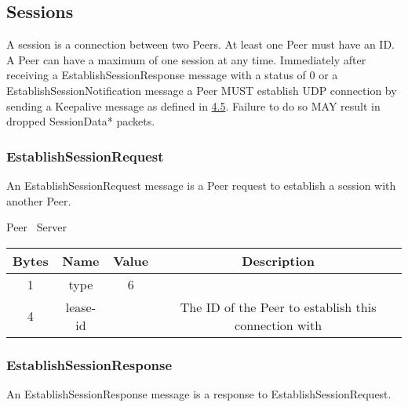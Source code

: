 \subsection{Sessions}

A session is a connection between two Peers. At least one Peer must have an ID. A Peer can have a maximum of one
session at any time. Immediately after receiving a EstablishSessionResponse message with a status
of 0 or a EstablishSessionNotification message a Peer MUST establish UDP connection by sending a
Keepalive message as defined in \hyperlink{subsection.4.5}{4.5}. Failure to do so MAY result in dropped
SessionData* packets.

\subsubsection{EstablishSessionRequest}

An EstablishSessionRequest message is a Peer request to establish a session with another Peer.

\begin{center}
    Peer \textrightarrow\ Server\\
    \begin{tabular}{|c|c|c|c|}
        \hline
        \textbf{Bytes} & \textbf{Name} & \textbf{Value} & \textbf{Description}                                 \\
        \hline
        1              & type          & 6              &                                                      \\
        \hline
        4              & lease-id      &                & The ID of the Peer to establish this connection with \\
        \hline
    \end{tabular}
\end{center}

\subsubsection{EstablishSessionResponse}

An EstablishSessionResponse message is a response to EstablishSessionRequest.


